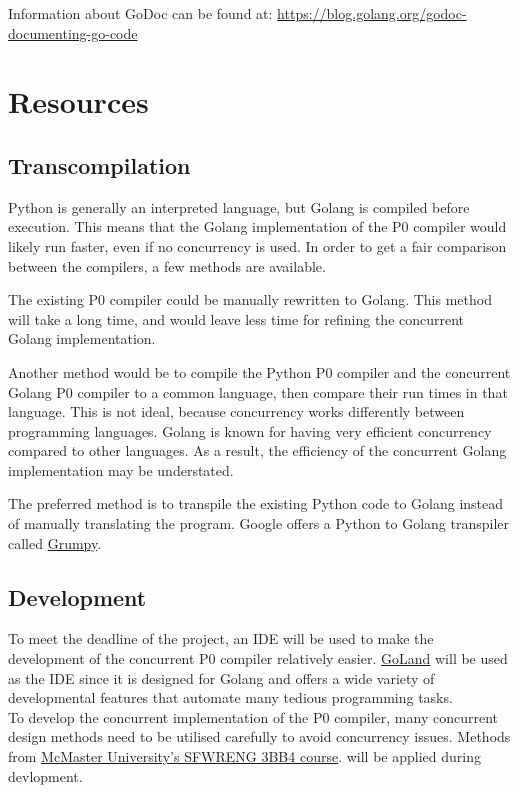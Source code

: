 \documentclass{article}
\begin{document}
Information about GoDoc can be found at: \url{https://blog.golang.org/godoc-documenting-go-code}

\section{Resources}

\subsection{Transcompilation}

Python is generally an interpreted language, but Golang is compiled before execution.
This means that the Golang implementation of the P0 compiler would likely run
faster, even if no concurrency is used.
In order to get a fair comparison between the compilers, a few methods are
available.

The existing P0 compiler could be manually rewritten to Golang.
This method will take a long time, and would leave less time for refining the
concurrent Golang implementation.

Another method would be to compile the Python P0 compiler and the concurrent Golang
P0 compiler to a common language, then compare their run times in that 
language.
This is not ideal, because concurrency works differently between programming
languages.
Golang is known for having very efficient concurrency compared to other languages.
As a result, the efficiency of the concurrent Golang implementation may be
understated.

The preferred method is to transpile the existing Python code to Golang instead of
manually translating the program.
Google offers a Python to Golang transpiler called
\href{https://github.com/google/grumpy}{Grumpy}.


\subsection{Development}
To meet the deadline of the project, an IDE will be used to make the development of the concurrent
P0 compiler relatively easier. \href{https://www.jetbrains.com/go/}{GoLand} will be used as the IDE
since it is designed for Golang and offers a wide variety of developmental features that automate
many tedious programming tasks.\\
To develop the concurrent implementation of the P0 compiler, many concurrent design methods
need to be utilised carefully to avoid concurrency issues. Methods from \href{https://www.cas.mcmaster.ca/~se3bb4/}{McMaster University's SFWRENG 3BB4 course}. will
be applied during devlopment.\\
\end{document}
